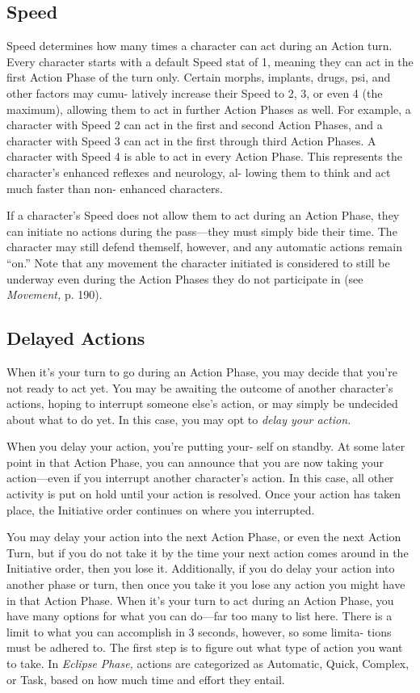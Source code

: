 \subsection{Speed}

Speed determines how many times a character can 
act during an Action turn. Every character starts with 
a default Speed stat of 1, meaning they can act in the 
first Action Phase of the turn only. Certain morphs, 
implants, drugs, psi, and other factors may cumu-
latively increase their Speed to 2, 3, or even 4 (the 
maximum), allowing them to act in further Action 
Phases as well. For example, a character with Speed 
2 can act in the first and second Action Phases, and 
a character with Speed 3 can act in the first through 
third Action Phases. A character with Speed 4 is 
able to act in every Action Phase. This represents 
the character's enhanced reflexes and neurology, al-
lowing them to think and act much faster than non-
enhanced characters.

If a character's Speed does not allow them to act 
during an Action Phase, they can initiate no actions 
during the pass—they must simply bide their time. 
The character may still defend themself, however, and 
any automatic actions remain ``on.'' Note that any 
movement the character initiated is considered to still 
be underway even during the Action Phases they do 
not participate in (see \textit{Movement,} p. 190).

\subsection{Delayed Actions}

When it's your turn to go during an Action Phase, 
you may decide that you're not ready to act yet. You 
may be awaiting the outcome of another character's 
actions, hoping to interrupt someone else's action, or 
may simply be undecided about what to do yet. In this 
case, you may opt to \textit{delay your action.}

When you delay your action, you're putting your-
self on standby. At some later point in that Action 
Phase, you can announce that you are now taking 
your action—even if you interrupt another character's 
action. In this case, all other activity is put on hold 
until your action is resolved. Once your action has 
taken place, the Initiative order continues on where 
you interrupted.

You may delay your action into the next Action 
Phase, or even the next Action Turn, but if you do not 
take it by the time your next action comes around in 
the Initiative order, then you lose it. Additionally, if 
you do delay your action into another phase or turn, 
then once you take it you lose any action you might 
have in that Action Phase.
When it's your turn to act during an Action Phase, 
you have many options for what you can do—far too 
many to list here. There is a limit to what you can 
accomplish in 3 seconds, however, so some limita-
tions must be adhered to. The first step is to figure 
out what type of action you want to take. In \textit{Eclipse }
\textit{Phase,} actions are categorized as Automatic, Quick, 
Complex, or Task, based on how much time and 
effort they entail.

